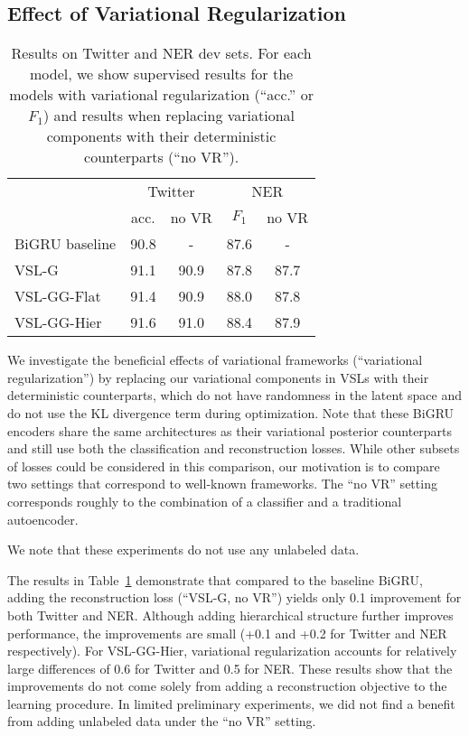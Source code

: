 \documentclass[11pt,a4paper]{article}
\newcommand{\vsmg}{VSL-G\xspace}
\newcommand{\vsmggflat}{VSL-GG-Flat\xspace}
\newcommand{\vsmgghier}{VSL-GG-Hier\xspace}
\begin{document}
\subsection{Effect of Variational Regularization}
\begin{table}[t]
\setlength{\tabcolsep}{4pt}
\centering
\begin{tabular}{l|c|c|c|c}
        & \multicolumn{2}{c|}{Twitter} & \multicolumn{2}{c}{NER} \\
        & \multicolumn{1}{c}{acc.} & no VR & \multicolumn{1}{c}{$F_{1}$} & no VR \\
\hline
BiGRU baseline     & 90.8  &   -  & 87.6 & -   \\
\vsmg              & 91.1  & 90.9 & 87.8 & 87.7 \\
\vsmggflat         & 91.4  & 90.9 & 88.0 & 87.8 \\
\vsmgghier         & 91.6  & 91.0 & 88.4 & 87.9 \\
\end{tabular}
\caption{Results on Twitter and NER dev sets. For each model, we show supervised results for the models with variational regularization (``acc.'' or $F_{1}$) and results when replacing variational components with their deterministic counterparts (``no VR'').}
\label{vr-reg}
\end{table}

We investigate the beneficial effects of variational frameworks (``variational regularization'') by replacing our variational components in VSLs with their deterministic counterparts, which do not have randomness in the latent space and do not use the KL divergence term during optimization.
Note that these BiGRU encoders share the same architectures as their variational posterior counterparts and still use both the classification and
reconstruction losses.
While other subsets of losses could be considered in this comparison, our motivation is to compare two settings that correspond to well-known frameworks. The ``no VR'' setting corresponds roughly to the combination of a classifier and a traditional autoencoder.

We note that these experiments do not use any unlabeled data.

The results in Table~\ref{vr-reg} demonstrate that compared to the baseline BiGRU, adding the reconstruction loss (``\vsmg, no VR'') yields only 0.1 improvement for both Twitter and NER. Although adding hierarchical structure further improves performance, the improvements are small (+0.1 and +0.2 for Twitter and NER respectively).
For \vsmgghier, variational regularization accounts for relatively large differences of 0.6 for Twitter and 0.5 for NER. These results show that the improvements do not come solely from adding a reconstruction objective to the learning procedure. In limited preliminary experiments, we did not find a benefit from adding unlabeled data under the ``no VR'' setting.
\end{document}
